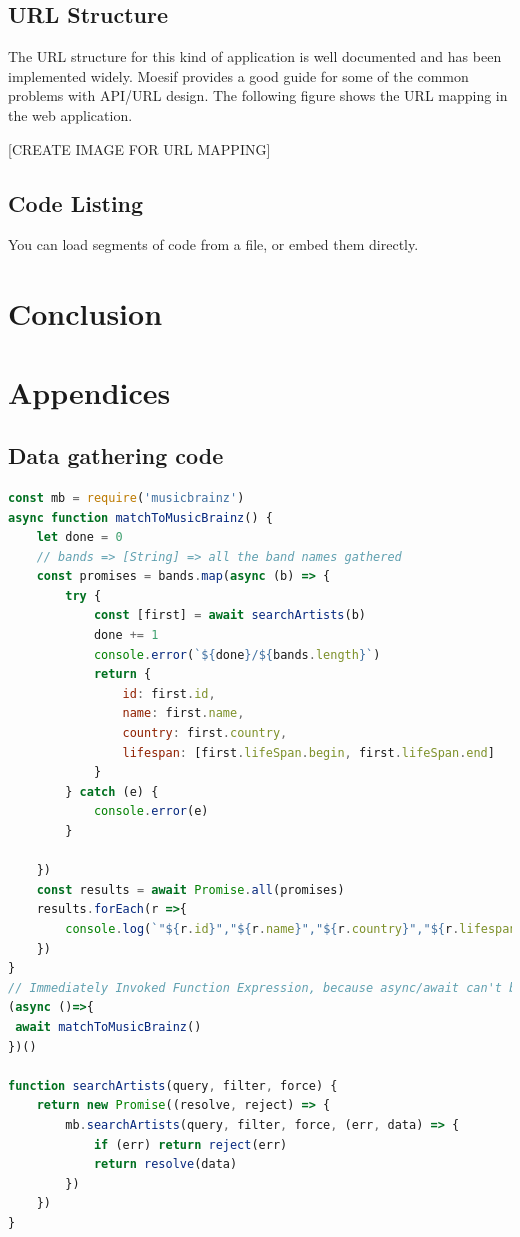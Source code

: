 \documentclass[10pt, a4paper]{article}
\begin{document}
    \subsection{URL Structure}
    The URL structure for this kind of application is well documented and has been implemented widely. Moesif\cite{Moesif} provides a good guide for some of the common problems with API/URL design.
    The following figure shows the URL mapping in the web application.
    
    [CREATE IMAGE FOR URL MAPPING]
	
	\subsection{Code Listing}
    You can load segments of code from a file, or embed them directly.
   
	
\section{Conclusion}	


\section{Appendices}
\subsection{Data gathering code}

\begin{lstlisting}[language=JavaScript, label=lst:artistLookup, caption = Artist name to MusicBrainzID lookup ]
const mb = require('musicbrainz')
async function matchToMusicBrainz() {
    let done = 0
    // bands => [String] => all the band names gathered
    const promises = bands.map(async (b) => {
        try {
            const [first] = await searchArtists(b)
            done += 1
            console.error(`${done}/${bands.length}`)
            return {
                id: first.id,
                name: first.name,
                country: first.country,
                lifespan: [first.lifeSpan.begin, first.lifeSpan.end]
            }
        } catch (e) {
            console.error(e)
        }

    })
    const results = await Promise.all(promises)
    results.forEach(r =>{
        console.log(`"${r.id}","${r.name}","${r.country}","${r.lifespan[0]} ${r.lifespan[1]}"`)
    })
}
// Immediately Invoked Function Expression, because async/await can't be used at top level
(async ()=>{
 await matchToMusicBrainz()
})()

function searchArtists(query, filter, force) {
    return new Promise((resolve, reject) => {
        mb.searchArtists(query, filter, force, (err, data) => {
            if (err) return reject(err)
            return resolve(data)
        })
    })
}
\end{lstlisting}
\end{document}
